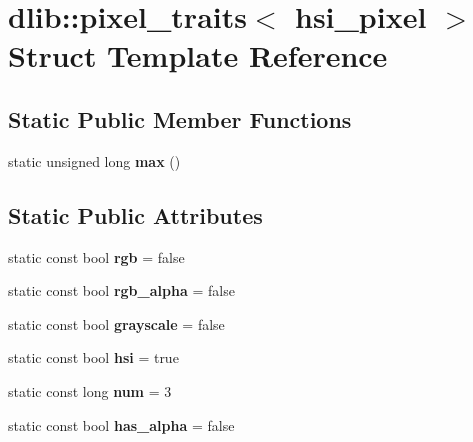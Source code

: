\hypertarget{structdlib_1_1pixel__traits_3_01hsi__pixel_01_4}{
\section{dlib::pixel\_\-traits$<$ hsi\_\-pixel $>$ Struct Template Reference}
\label{structdlib_1_1pixel__traits_3_01hsi__pixel_01_4}
}
\subsection*{Static Public Member Functions}
\begin{DoxyCompactItemize}
\item 
\hypertarget{structdlib_1_1pixel__traits_3_01hsi__pixel_01_4_a09608d99b5b5779622e4c0a25fece089}{
static unsigned long {\bfseries max} ()}
\label{structdlib_1_1pixel__traits_3_01hsi__pixel_01_4_a09608d99b5b5779622e4c0a25fece089}

\end{DoxyCompactItemize}
\subsection*{Static Public Attributes}
\begin{DoxyCompactItemize}
\item 
\hypertarget{structdlib_1_1pixel__traits_3_01hsi__pixel_01_4_af6b191b1f9c11c43722fa848cffd00d5}{
static const bool {\bfseries rgb} = false}
\label{structdlib_1_1pixel__traits_3_01hsi__pixel_01_4_af6b191b1f9c11c43722fa848cffd00d5}

\item 
\hypertarget{structdlib_1_1pixel__traits_3_01hsi__pixel_01_4_a072504a7d58fd17b2421560dcacc25d4}{
static const bool {\bfseries rgb\_\-alpha} = false}
\label{structdlib_1_1pixel__traits_3_01hsi__pixel_01_4_a072504a7d58fd17b2421560dcacc25d4}

\item 
\hypertarget{structdlib_1_1pixel__traits_3_01hsi__pixel_01_4_a02e32045f3fa3056470f0670244bd55e}{
static const bool {\bfseries grayscale} = false}
\label{structdlib_1_1pixel__traits_3_01hsi__pixel_01_4_a02e32045f3fa3056470f0670244bd55e}

\item 
\hypertarget{structdlib_1_1pixel__traits_3_01hsi__pixel_01_4_a67ac73ee28e00179d70bd4a22ea39af4}{
static const bool {\bfseries hsi} = true}
\label{structdlib_1_1pixel__traits_3_01hsi__pixel_01_4_a67ac73ee28e00179d70bd4a22ea39af4}

\item 
\hypertarget{structdlib_1_1pixel__traits_3_01hsi__pixel_01_4_a0eaba4f435662b7acf43356c126bfd1a}{
static const long {\bfseries num} = 3}
\label{structdlib_1_1pixel__traits_3_01hsi__pixel_01_4_a0eaba4f435662b7acf43356c126bfd1a}

\item 
\hypertarget{structdlib_1_1pixel__traits_3_01hsi__pixel_01_4_a693f2baa6c2dfb42326b768c612fc4cd}{
static const bool {\bfseries has\_\-alpha} = false}
\label{structdlib_1_1pixel__traits_3_01hsi__pixel_01_4_a693f2baa6c2dfb42326b768c612fc4cd}

\end{DoxyCompactItemize}
